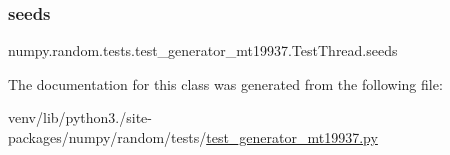 \subsubsection{\texorpdfstring{seeds}{seeds}}
{\footnotesize\ttfamily numpy.\+random.\+tests.\+test\+\_\+generator\+\_\+mt19937.\+Test\+Thread.\+seeds}



The documentation for this class was generated from the following file\+:\begin{DoxyCompactItemize}
\item 
venv/lib/python3./site-\/packages/numpy/random/tests/\hyperlink{test__generator__mt19937_8py}{test\+\_\+generator\+\_\+mt19937.\+py}\end{DoxyCompactItemize}
